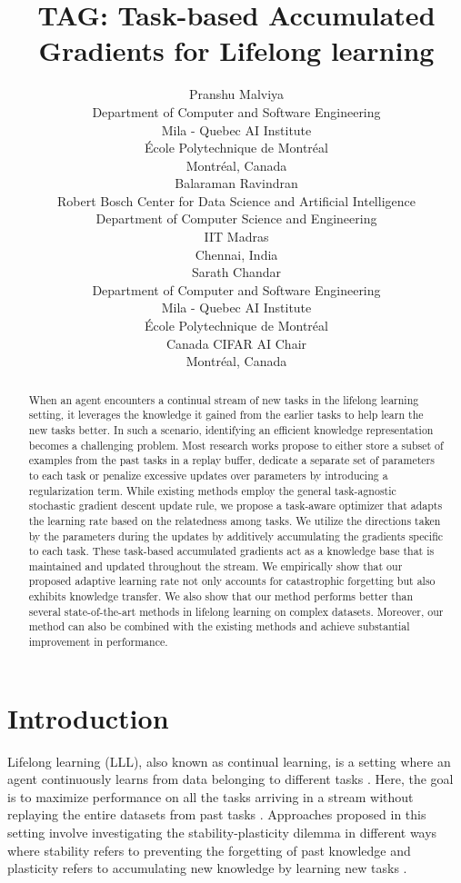 \documentclass{article} \usepackage{collas2022_conference,times}
\title{TAG: Task-based Accumulated Gradients for Lifelong learning}
\author{Pranshu Malviya \\Department of Computer and Software Engineering\\
Mila - Quebec AI Institute\\
École Polytechnique de Montréal\\
Montréal, Canada \\
\And Balaraman Ravindran \\
Robert Bosch Center for Data Science and Artificial Intelligence \\
Department of Computer Science and Engineering \\
IIT Madras \\ 
Chennai, India \\
\AND Sarath Chandar \\
Department of Computer and Software Engineering\\
Mila - Quebec AI Institute \\
École Polytechnique de Montréal \\
Canada CIFAR AI Chair \\
Montréal, Canada \\
}
\begin{document}
\maketitle

\begin{abstract}
When an agent encounters a continual stream of new tasks in the lifelong learning setting, it leverages the knowledge it gained from the earlier tasks to help learn the new tasks better. In such a scenario, identifying an efficient knowledge representation becomes a challenging problem. Most research works propose to either store a subset of examples from the past tasks in a replay buffer, dedicate a separate set of parameters to each task or penalize excessive updates over parameters by introducing a regularization term. While existing methods employ the general task-agnostic stochastic gradient descent update rule, we propose a task-aware optimizer that adapts the learning rate based on the relatedness among tasks. We utilize the directions taken by the parameters during the updates by additively accumulating the gradients specific to each task. These task-based accumulated gradients act as a knowledge base that is maintained and updated throughout the stream. We empirically show that our proposed adaptive learning rate not only accounts for catastrophic forgetting but also exhibits knowledge transfer. We also show that our method performs better than several state-of-the-art methods in lifelong learning on complex datasets. Moreover, our method can also be combined with the existing methods and achieve substantial improvement in performance.
\end{abstract}



\section{Introduction}
    


    Lifelong learning (LLL), also known as continual learning, is a setting where an agent continuously learns from data belonging to different tasks \citep{parisi2019continual}. Here, the goal is to maximize performance on all the tasks arriving in a stream without replaying the entire datasets from past tasks \citep{riemer2018learning}. Approaches proposed in this setting involve investigating the stability-plasticity dilemma \citep{mermillod2013stability} in different ways where stability refers to preventing the forgetting of past knowledge and plasticity refers to accumulating new knowledge by learning new tasks \citep{mermillod2013stability, delange2021continual}. 
    
\end{document}
